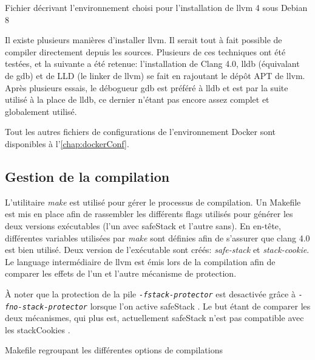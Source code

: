 \begin{listing}
	\caption{Fichier décrivant l'environnement choisi pour l'installation de \gls{llvm} 4 sous Debian 8}
	\label{lst:dockerfile}
\end{listing}

Il existe plusieurs manières d'installer \gls{llvm}. Il serait tout à fait possible de compiler directement depuis les sources. Plusieurs de ces techniques ont été testées, et la suivante a été retenue: l'installation de Clang 4.0, \gls{lldb} (équivalant de \gls{gdb}) et de LLD (le \og linker \fg de \gls{llvm}) se fait en rajoutant le dépôt APT de \gls{llvm}. Après plusieurs essais, le débogueur \gls{gdb} est préféré à \gls{lldb} et est par la suite utilisé à la place de \gls{lldb}, ce dernier n'étant pas encore assez complet et globalement utilisé.

Tout les autres fichiers de configurations de l'environnement Docker sont disponibles à l'\autoref{chap:dockerConf}.

\subsection{Gestion de la compilation}

L'utilitaire \textit{make} est utilisé pour gérer le processus de compilation. Un Makefile est mis en place afin de rassembler les différents \og flags \fg utilisés pour générer les deux versions exécutables (l'un avec \gls{safeStack} et l'autre sans). En en-tête, différentes variables utilisées par \textit{make} sont définies afin de s'assurer que \gls{clang} 4.0 est bien utilisé. Deux version de l'exécutable sont créés: \textit{safe-stack} et \textit{stack-cookie}. Le language intermédiaire de \gls{llvm} est émis lors de la compilation afin de comparer les effets de l'un et l'autre mécanisme de protection.

À noter que la protection de la pile \texttt{\textit{-fstack-protector}} est desactivée grâce à \texttt{\textit{-fno-stack-protector}} lorsque l'on active \og \gls{safeStack} \fg. Le but étant de comparer les deux mécanismes, qui plus est, actuellement \og \gls{safeStack} \fg n'est pas compatible avec les \og \gls{stackCookies} \fg.

\begin{listing}
	\caption{Makefile regroupant les différentes options de compilations}
	\label{lst:defaultMakefile}
\end{listing}

